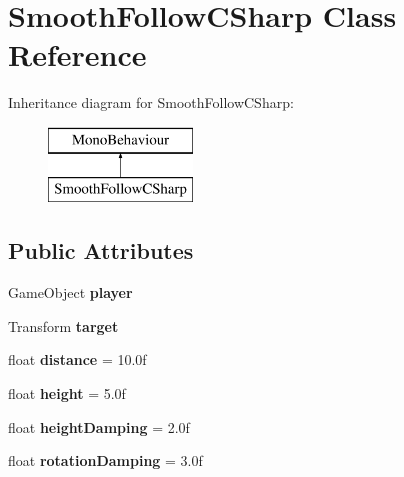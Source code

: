 \hypertarget{class_smooth_follow_c_sharp}{}\section{Smooth\+Follow\+C\+Sharp Class Reference}
\label{class_smooth_follow_c_sharp}
Inheritance diagram for Smooth\+Follow\+C\+Sharp\+:\begin{figure}[H]
\begin{center}
\leavevmode
\includegraphics[height=2.000000cm]{class_smooth_follow_c_sharp}
\end{center}
\end{figure}
\subsection*{Public Attributes}
\begin{DoxyCompactItemize}
\item 
\mbox{\label{class_smooth_follow_c_sharp_a4b59a22fc0135bb7a3fe25722b990651}} 
Game\+Object {\bfseries player}
\item 
\mbox{\label{class_smooth_follow_c_sharp_a54adf45ab95f25ef674b3bbefbb84b93}} 
Transform {\bfseries target}
\item 
\mbox{\label{class_smooth_follow_c_sharp_a9d8fe018c7b721f11897444285068a25}} 
float {\bfseries distance} = 10.\+0f
\item 
\mbox{\label{class_smooth_follow_c_sharp_af4b9ac337de3d2928643428c62e129d7}} 
float {\bfseries height} = 5.\+0f
\item 
\mbox{\label{class_smooth_follow_c_sharp_a02af76783c5b89bca555cd12da0f5645}} 
float {\bfseries height\+Damping} = 2.\+0f
\item 
\mbox{\label{class_smooth_follow_c_sharp_ab74ab1622b09584bdd7c04a77f3e31b7}} 
float {\bfseries rotation\+Damping} = 3.\+0f
\end{DoxyCompactItemize}
